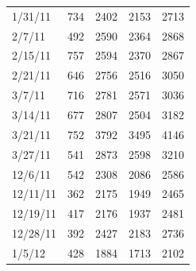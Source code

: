 \begin{landscape}
\begin{table}[htbp]
\begin{tabular}{@{}lllll@{}}
1/31/11     & 734                                    & 2402                                     & 2153                             & 2713                           \\
2/7/11      & 492                                    & 2590                                   & 2364                           & 2868                           \\
2/15/11     & 757                                    & 2594                                   & 2370                            & 2867                           \\
2/21/11     & 646                                    & 2756                                   & 2516                           & 3050                           \\
3/7/11      & 716                                    & 2781                                    & 2571                           & 3036                           \\
3/14/11     & 677                                    & 2807                                   & 2504                           & 3182                           \\
3/21/11     & 752                                    & 3792                                   & 3495                           & 4146                             \\
3/27/11     & 541                                    & 2873                                   & 2598                           & 3210                           \\
12/6/11     & 542                                    & 2308                                   & 2086                           & 2586                           \\
12/11/11    & 362                                    & 2175                                   & 1949                           & 2465                           \\
12/19/11    & 417                                    & 2176                                   & 1937                           & 2481                           \\
12/28/11    & 392                                    & 2427                                    & 2183                           & 2736                           \\
1/5/12      & 428                                    & 1884                                   & 1713                           & 2102                           \\

\end{tabular}
\end{table}
\end{landscape}
